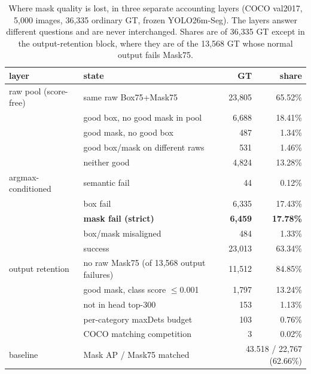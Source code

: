 ﻿\documentclass[times,twocolumn,final,authoryear]{elsarticle}
\begin{document}
\begin{table}[t]
\caption{Where mask quality is lost, in three separate accounting layers (COCO val2017, 5{,}000
images, 36{,}335 ordinary GT, frozen YOLO26m-Seg). The layers answer different questions and are
never interchanged. Shares are of 36{,}335 GT except in the output-retention block, where they are
of the 13{,}568 GT whose normal output fails Mask75.}
\label{tab:accounting}
\centering
\begin{tabular}{@{}llrr@{}}
\toprule
layer & state & GT & share \\
\midrule
raw pool (score-free) & same raw Box75+Mask75        & 23{,}805 & 65.52\% \\
                      & good box, no good mask in pool& 6{,}688 & 18.41\% \\
                      & good mask, no good box       & 487 & 1.34\% \\
                      & good box/mask on different raws& 531 & 1.46\% \\
                      & neither good                  & 4{,}824 & 13.28\% \\
\midrule
argmax-conditioned    & semantic fail                 & 44 & 0.12\% \\
                     & box fail                      & 6{,}335 & 17.43\% \\
                     & \textbf{mask fail (strict)}   & \textbf{6{,}459} & \textbf{17.78\%} \\
                     & box/mask misaligned           & 484 & 1.33\% \\
                     & success                       & 23{,}013 & 63.34\% \\
\midrule
output retention      & no raw Mask75 (of 13{,}568 output failures) & 11{,}512 & 84.85\% \\
                     & good mask, class score $\le$0.001 & 1{,}797 & 13.24\% \\
                     & not in head top-300            & 153 & 1.13\% \\
                     & per-category maxDets budget   & 103 & 0.76\% \\
                     & COCO matching competition     & 3 & 0.02\% \\
\midrule
baseline              & Mask AP / Mask75 matched     & \multicolumn{2}{r}{43.518 / 22{,}767 (62.66\%)} \\
\bottomrule
\end{tabular}
\end{table}
\end{document}
